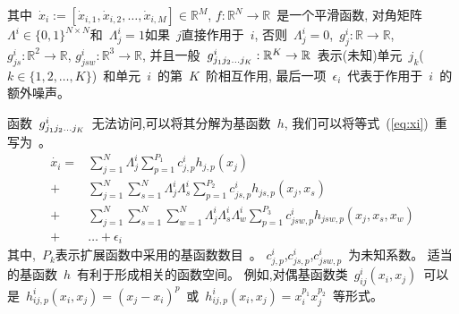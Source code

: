 其中~$\dot{x}_i :=[\dot{x}_{i,1}, \dot{x}_{i,2},\ldots,\dot{x}_{i,M}]\in \mathbb{R}^M$,
$f:\mathbb{R}^N \to \mathbb{R}$~是一个平滑函数, 
对角矩阵~$\Lambda^i \in \{0,1\}^{N \times N}$和~$\Lambda^i_{j}=1$如果~$j$直接作用于~$i$, 
否则~$\Lambda^i_{j}=0$,~$g^i_j:\mathbb{R} \to \mathbb{R}$, $g^i_{js}:\mathbb{R}^2 \to \mathbb{R}$, $g^i_{jsw}:\mathbb{R}^3 \to \mathbb{R}$,
并且一般~$g^i_{j_{1}j_{2}\ldots\\j_{K}}:\mathbb{R}^K \to \mathbb{R}$~表示(未知)单元~$j_k$($k \in \{1,2,\ldots,K\}$)~和单元~$i$~的第~$K$~阶相互作用, 
最后一项~$\epsilon_{i}$~代表于作用于~$i$~的额外噪声。

函数~$g^i_{j_{1}j_{2}\ldots\\j_{K}}$~无法访问,可以将其分解为基函数~$h$,
我们可以将等式~(\ref{eq:xi})~重写为~\cite{casadiego2017model}。
\begin{equation}
\label{eq:xi_with_h}
\begin{split}
\dot{x_i} =  &\sum_{j=1}^{N} \Lambda^i_{j} \sum_{p=1}^{P_1} c^i_{j,p}h_{j,p}(x_j) \\
+ &  \sum_{j=1}^{N} \sum_{s=1}^{N}\Lambda^i_{j}\Lambda^i_{s} \sum_{p=1}^{P_2} c^i_{js,p}h_{js,p}(x_j,x_s) \\
                             + &\sum_{j=1}^{N} \sum_{s=1}^{N} \sum_{w=1}^{N}\Lambda^i_{j}\Lambda^i_{s}\Lambda^i_{w} \sum_{p=1}^{P_3} c^i_{jsw,p}h_{jsw,p}(x_j,x_s,x_w)\\
                             + &\ldots + \epsilon_{i} 
\end{split}
\end{equation}
其中,~$P_k$表示扩展函数中采用的基函数数目~\cite{friedman2001elements}。
$c^i_{j,p}$,$c^i_{js,p}$,$c^i_{jsw,p}$~为未知系数。
适当的基函数~$h$~有利于形成相关的函数空间。
例如,对偶基函数类~$g^i_{ij}(x_i,x_j)$~可以是~$h^i_{ij,p}(x_i,x_j)=(x_j-x_i)^p$~或~$h^i_{ij,p}(x_i,x_j)=x^{p_{1}}_i x^{p_{2}}_j$~等形式。


